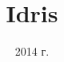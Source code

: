 \documentclass{beamer}
\title{Idris}
\date{\scriptsize 2014 г.}
\begin{document}
\frame{\titlepage}


\end{document}
